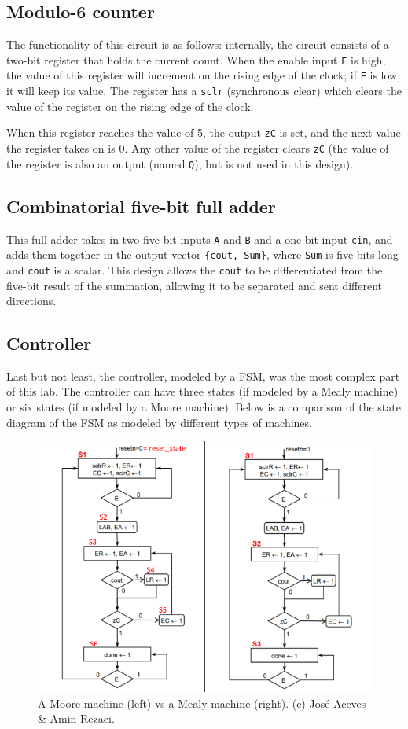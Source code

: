 \documentclass{article}
\renewcommand{\c}[1]{\texttt{#1}}
\begin{document}
\subsection{Modulo-6 counter} The functionality of this
circuit is as follows: internally, the circuit consists of a
two-bit register that holds the current count. When the enable
input \c{E} is high, the value of this register will increment
on the rising edge of the clock; if \c{E} is low, it will
keep its value. The register has a \c{sclr} (synchronous
clear) which clears the value of the register on the rising
edge of the clock.

When this register reaches the value of 5, the output \c{zC}
is set, and the next value the register takes on is 0. Any
other value of the register clears \c{zC} (the value of the
register is also an output (named \c{Q}), but is not used
in this design).

\subsection{Combinatorial five-bit full adder} This full
adder takes in two five-bit inputs \c{A} and \c{B} and a
one-bit input \c{cin}, and adds them together in the output vector
\c{\{cout, Sum\}}, where \c{Sum} is five bits long and \c{cout}
is a scalar. This design allows the \c{cout} to be
differentiated from the five-bit result of the summation,
allowing it to be separated and sent different directions.

\subsection{Controller} Last but not least, the controller,
modeled by a FSM, was the most complex part of this lab.
The controller can have three states
(if modeled by a Mealy machine)
or six states (if modeled by a Moore machine). Below is a
comparison of the state diagram of the FSM as modeled
by different types of machines.

\begin{figure}[H]
    \centering
    \includegraphics[width=\textwidth]{Images/FSM_diagram.png}
    \caption{A Moore machine (left) vs a Mealy machine (right). (c) Jos\'e Aceves \& Amin Rezaei.}
    \label{statediagram}
\end{figure}
\end{document}
